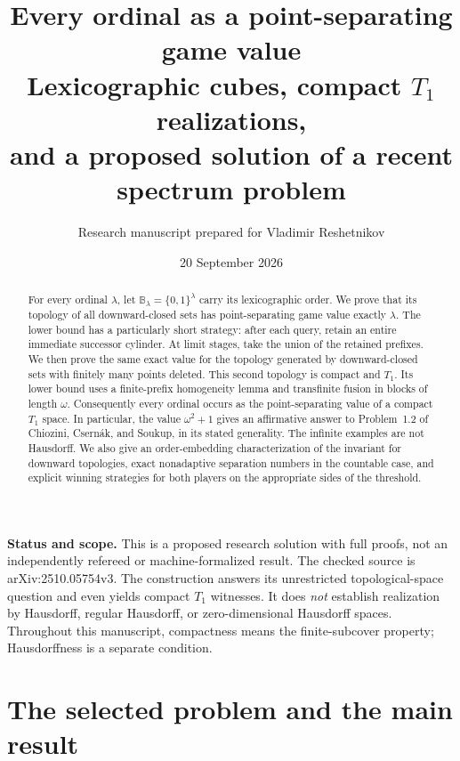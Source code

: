 \documentclass[11pt,a4paper]{article}
\title{\color{Ink}\LARGE Every ordinal as a point-separating game value\\[5pt]
\large Lexicographic cubes, compact $T_1$ realizations,\\
and a proposed solution of a recent spectrum problem}
\author{Research manuscript prepared for Vladimir Reshetnikov}
\date{20 September 2026}
\theoremstyle{definition}
\theoremstyle{remark}
\newcommand{\two}{\{0,1\}}
\newcommand{\B}{\mathbb B}
\begin{document}
\maketitle
\begin{abstract}
For every ordinal $\lambda$, let $\B_\lambda=\two^\lambda$ carry its
lexicographic order. We prove that its topology of all downward-closed sets has
point-separating game value exactly $\lambda$. The lower bound has a particularly
short strategy: after each query, retain an entire immediate successor cylinder.
At limit stages, take the union of the retained prefixes. We then prove the
same exact value for the topology generated by downward-closed sets with finitely
many points deleted. This second topology is compact and $T_1$. Its lower bound
uses a finite-prefix homogeneity lemma and transfinite fusion in blocks of length
$\omega$. Consequently every ordinal occurs as the point-separating value of a
compact $T_1$ space. In particular, the value $\omega^2+1$ gives an affirmative
answer to Problem~1.2 of Chiozini, Csern\'ak, and Soukup, in its stated generality.
The infinite examples are not Hausdorff. We also give an order-embedding
characterization of the invariant for downward topologies, exact nonadaptive
separation numbers in the countable case, and explicit winning strategies for
both players on the appropriate sides of the threshold.
\end{abstract}
\begin{resultbox}
\textbf{Status and scope.} This is a proposed research solution with full proofs,
not an independently refereed or machine-formalized result. The checked source is
arXiv:2510.05754v3. The construction answers its unrestricted topological-space
question and even yields compact $T_1$ witnesses. It does \emph{not} establish
realization by Hausdorff, regular Hausdorff, or zero-dimensional Hausdorff spaces.
Throughout this manuscript, compactness means the finite-subcover property;
Hausdorffness is a separate condition.
\end{resultbox}
\clearpage
\tableofcontents
\clearpage

\section{The selected problem and the main result}
\end{document}
